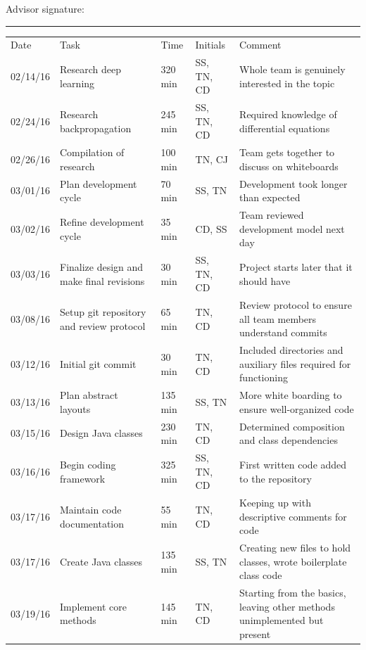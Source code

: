 \documentclass[letterpaper, 10pt]{article}
\begin{document}
	Advisor signature:
	\rule{10cm}{0.4pt}
	\footnotesize
	\begin{center}
	\renewcommand{\arraystretch}{2.15}
	
	\begin{tabular} { l || p{1.25 in}| l| l|p{2.50in}}
		Date 	& Task 								& Time 	& Initials 		& Comment \\
		02/14/16 	& Research deep learning 				& 320 min	& SS, TN, CD	& Whole team is genuinely interested in the topic \\
		02/24/16 	& Research backpropagation 				& 245 min & SS, TN, CD	& Required knowledge of differential equations \\
		02/26/16 	& Compilation of research 				& 100 min	& TN, CJ		& Team gets together to discuss on whiteboards \\
		03/01/16 	& Plan development cycle 				& 70 min	& SS, TN 		& Development took longer than expected \\
		03/02/16 	& Refine development cycle	 			& 35 min	& CD, SS 		& Team reviewed development model next day \\
		03/03/16 	& Finalize design and make final revisions 	& 30 min 	& SS, TN, CD 	& Project starts later that it should have \\
		03/08/16 	& Setup git repository and review protocol 	& 65 min 	& TN, CD 		& Review protocol to ensure all team members understand commits \\
		03/12/16 	& Initial git commit						& 30 min	& TN, CD		& Included directories and auxiliary files required for functioning \\
		03/13/16 	& Plan abstract layouts					& 135 min	& SS, TN 		& More white boarding to ensure well-organized code \\
		03/15/16 	& Design Java classes					& 230 min	& TN, CD 		& Determined composition and class dependencies \\
		03/16/16 	& Begin coding framework					& 325 min	& SS, TN, CD	& First written code added to the repository \\
		03/17/16 	& Maintain code documentation				& 55 min	& TN, CD		& Keeping up with descriptive comments for code \\
		03/17/16 	& Create Java classes					& 135 min	& SS, TN 		& Creating new files to hold classes, wrote boilerplate class code \\
		03/19/16 	& Implement core methods				& 145 min	& TN, CD 		& Starting from the basics, leaving other methods unimplemented but present \\

\end{tabular}
\end{center}
\end{document}
